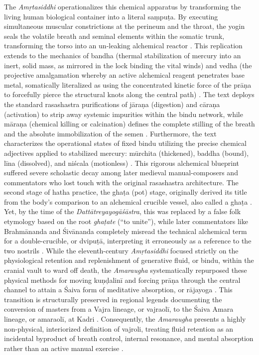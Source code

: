 \documentclass[11pt,twoside,letterpaper]{article}
\begin{document}
The \textit{Amṛtasiddhi} operationalizes this chemical apparatus by transforming the living human biological container into a literal saṃpuṭa. By executing simultaneous muscular constrictions at the perineum and the throat, the yogin seals the volatile breath and seminal elements within the somatic trunk, transforming the torso into an un-leaking alchemical reactor \citep{Mallinson2021}. This replication extends to the mechanics of bandha (thermal stabilization of mercury into an inert, solid mass, as mirrored in the lock binding the vital winds) and vedha (the projective amalgamation whereby an active alchemical reagent penetrates base metal, somatically literalized as using the concentrated kinetic force of the prāṇa to forcefully pierce the structural knots along the central path) \citep{Mallinson2021}. The text deploys the standard rasashastra purifications of jāraṇa (digestion) and cāraṇa (activation) to strip away systemic impurities within the bindu network, while māraṇa (chemical killing or calcination) defines the complete stilling of the breath and the absolute immobilization of the semen \citep{Mallinson2021}. Furthermore, the text characterizes the operational states of fixed bindu utilizing the precise chemical adjectives applied to stabilized mercury: mūrchita (thickened), baddha (bound), līna (dissolved), and niścala (motionless) \citep{Mallinson2021}. This rigorous alchemical blueprint suffered severe scholastic decay among later medieval manual-composers and commentators who lost touch with the original rasashastra architecture. The second stage of hatha practice, the ghaṭa (pot) stage, originally derived its title from the body's comparison to an alchemical crucible vessel, also called a ghaṭa \citep{Mallinson2021}. Yet, by the time of the \textit{Dattātreyayogāśāstra}, this was replaced by a false folk etymology based on the root \textit{ghaṭate} (``to unite''), while later commentators like Brahmānanda and Śivānanda completely misread the technical alchemical term for a double-crucible, or dvipuṭā, interpreting it erroneously as a reference to the two nostrils \citep{Mallinson2021}. While the eleventh-century \textit{Amṛtasiddhi} focused strictly on the physiological retention and replenishment of generative fluid, or bindu, within the cranial vault to ward off death, the \textit{Amaraugha} systematically repurposed these physical methods for moving kuṇḍalinī and forcing prāṇa through the central channel to attain a Śaiva form of meditative absorption, or rājayoga \citep{Birch2024}. This transition is structurally preserved in regional legends documenting the conversion of masters from a Vajra lineage, or vajraolī, to the Śaiva Amara lineage, or amaraolī, at Kadri \citep{Birch2024}. Consequently, the \textit{Amaraugha} presents a highly non-physical, interiorized definition of vajroli, treating fluid retention as an incidental byproduct of breath control, internal resonance, and mental absorption rather than an active manual exercise \citep{Birch2024}.
\end{document}
